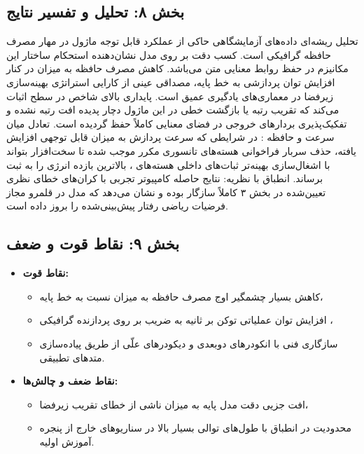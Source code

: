 \subsection*{بخش ۸: تحلیل و تفسیر نتایج }
تحلیل ریشه‌ای داده‌های آزمایشگاهی حاکی از عملکرد قابل توجه ماژول  در مهار مصرف حافظه گرافیکی است. کسب دقت  بر روی مدل  نشان‌دهنده استحکام ساختار این مکانیزم در حفظ روابط معنایی متن می‌باشد.
کاهش مصرف حافظه به میزان  در کنار افزایش توان پردازشی به  خط پایه، مصداقی عینی از کارایی استراتژی بهینه‌سازی زیرفضا در معماری‌های یادگیری عمیق است.
پایداری بالای شاخص  در سطح  اثبات می‌کند که تقریب رتبه یا بازگشت خطی در این ماژول دچار پدیده افت رتبه  نشده و تفکیک‌پذیری بردارهای خروجی در فضای معنایی کاملاً حفظ گردیده است.
تعادل میان سرعت و حافظه : در شرایطی که سرعت پردازش به میزان قابل توجهی افزایش یافته، حذف سربار فراخوانی هسته‌های تانسوری مکرر موجب شده تا سخت‌افزار بتواند با اشغال‌سازی بهینه‌تر ثبات‌های داخلی هسته‌های ، بالاترین بازده انرژی را به ثبت برساند.
انطباق با نظریه: نتایج حاصله کامپیوتر تجربی با کران‌های خطای نظری تعیین‌شده در بخش ۳ کاملاً سازگار بوده و نشان می‌دهد که مدل در قلمرو مجاز فرضیات ریاضی رفتار پیش‌بینی‌شده را بروز داده است.

\subsection*{بخش ۹: نقاط قوت و ضعف }
\begin{itemize}
    \item \textbf{نقاط قوت:}
    \begin{itemize}
        \item کاهش بسیار چشمگیر اوج مصرف حافظه به میزان  نسبت به خط پایه،
        \item افزایش توان عملیاتی توکن بر ثانیه به ضریب  بر روی پردازنده گرافیکی ،
        \item سازگاری فنی با انکودرهای دوبعدی و دیکودرهای علّی از طریق پیاده‌سازی متدهای تطبیقی.
    \end{itemize}
    \item \textbf{نقاط ضعف و چالش‌ها:}
    \begin{itemize}
        \item افت جزیی دقت مدل پایه به میزان  ناشی از خطای تقریب زیرفضا،
        \item محدودیت در انطباق با طول‌های توالی بسیار بالا در سناریوهای خارج از پنجره آموزش اولیه.
    \end{itemize}
\end{itemize}

